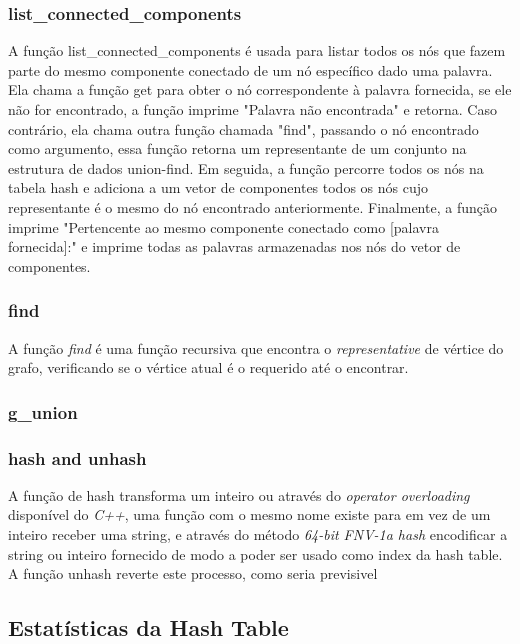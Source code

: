 \documentclass[a4paper,11pt]{article}
\begin{document}
    \subsubsection{list\_connected\_components}
    A função list\_connected\_components é usada para listar todos os nós que fazem parte do mesmo componente conectado de um nó específico dado uma palavra. Ela chama a função get para obter o nó correspondente à palavra fornecida, se ele não for encontrado, a função imprime "Palavra não encontrada" e retorna. Caso contrário, ela chama outra função chamada "find", passando o nó encontrado como argumento, essa função retorna um representante de um conjunto na estrutura de dados union-find. Em seguida, a função percorre todos os nós na tabela hash e adiciona a um vetor de componentes todos os nós cujo representante é o mesmo do nó encontrado anteriormente. Finalmente, a função imprime "Pertencente ao mesmo componente conectado como [palavra fornecida]:" e imprime todas as palavras armazenadas nos nós do vetor de componentes.
    
    \subsubsection{find}
    A função \emph{find} é uma função recursiva que encontra o \emph{representative}  de vértice do grafo, verificando se o vértice atual é o requerido até o encontrar.
    
    \subsubsection{g\_union}
    
   
    
    \subsubsection{hash and unhash}
    A função de hash transforma um inteiro ou através do \emph{operator overloading} disponível do \emph{C++}, uma função com o mesmo nome existe para em vez de um inteiro receber uma string, e através do método \emph{64-bit FNV-1a hash} encodificar a string ou inteiro fornecido de modo a poder ser usado como index da hash table. A função unhash reverte este processo, como seria previsivel


    \subsection{Estatísticas da Hash Table}\label{subsec:estatisticas-da-hash-table}
\end{document}
